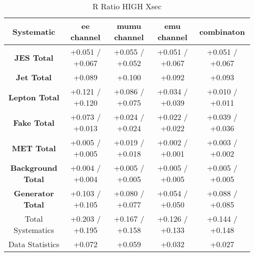 \begin{table}[htbp]
\scriptsize
  \begin{center} 
  \begin{tabular}{|c|c|c|c|c|}
  \hline
   Systematic                            &  ee channel&  mumu channel&  emu channel&  combinaton\\
 \hline
\textbf{JES Total}                    &+0.051   / +0.067   & +0.055   / +0.052   & +0.051   / +0.067   & +0.051   / +0.067  \\
\textbf{Jet Total}                    &+0.089              & +0.100              & +0.092              & +0.093             \\
\textbf{Lepton Total}                 &+0.121   / +0.120   & +0.086   / +0.075   & +0.034   / +0.039   & +0.010   / +0.011  \\
\textbf{Fake Total}                   &+0.073   / +0.013   & +0.024   / +0.024   & +0.022   / +0.022   & +0.039   / +0.036  \\
\textbf{MET Total}                    &+0.005   / +0.005   & +0.019   / +0.018   & +0.002   / +0.001   & +0.003   / +0.002  \\
\textbf{Background Total}             &+0.004   / +0.004   & +0.005   / +0.005   & +0.005   / +0.005   & +0.005   / +0.005  \\
\textbf{Generator Total}              &+0.103   / +0.105   & +0.080   / +0.077   & +0.054   / +0.050   & +0.088   / +0.085  \\
  \hline
  \hline
Total Systematics                     &+0.203   / +0.195   & +0.167   / +0.158   & +0.126   / +0.133   & +0.144   / +0.148  \\
Data Statistics                       &+0.072              & +0.059              & +0.032              & +0.027             \\
  \hline
  \end{tabular}
  \end{center} 
  \label{tab:xsec_nominal_rratio_high}
  \caption{R Ratio HIGH Xsec}
\end{table}

